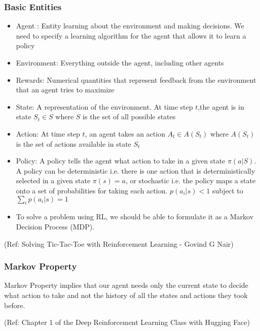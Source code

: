 \begin{frame}[fragile]\frametitle{Basic Entities}


\begin{itemize}
\item Agent : Entity learning about the environment and making decisions. We need to specify a learning algorithm for the agent that allows it to learn a policy
\item Environment: Everything outside the agent, including other agents
\item Rewards: Numerical quantities that represent feedback from the environment that an agent tries to maximize
\item State: A representation of the environment. At time step $t$,the agent is in state $S_t \in S$ where $S$ is the set of all possible states
\item Action: At time step $t$, an agent takes an action $A_t \in A(S_t)$ where $A(S_t)$ is the set of actions available in state $S_t$
\item Policy: A policy tells the agent what action to take in a given state $\pi(a|S)$. A policy can be deterministic i.e. there is one action that is deterministically selected in a given state $\pi(s)=a$, or stochastic i.e. the policy maps a state onto a set of probabilities for taking each action. $p(a_i|s) < 1$ subject to $\sum_{i} p(a_i|s) = 1$
\item To solve a problem using RL, we should be able to formulate it as a Markov Decision Process (MDP).
\end{itemize}



{\tiny (Ref: Solving Tic-Tac-Toe with Reinforcement Learning - Govind G Nair)}

\end{frame}

\begin{frame}[fragile]\frametitle{Markov Property}

Markov Property implies that our agent needs only the current state to decide what action to take and not the history of all the states and actions they took before.


{\tiny (Ref: Chapter 1 of the Deep Reinforcement Learning Class with Hugging Face)}


\end{frame}


